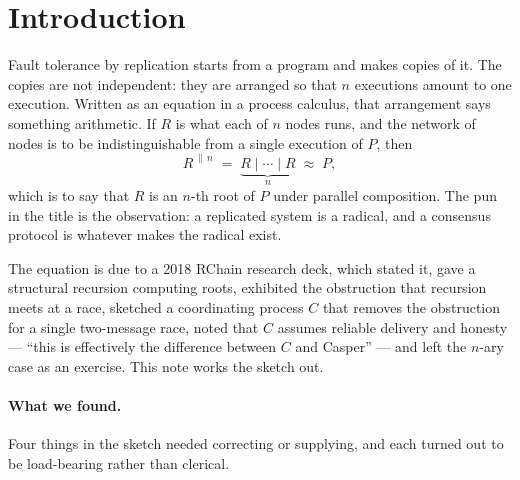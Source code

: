 \documentclass[11pt]{article}
\theoremstyle{definition}
\newcommand{\parn}[1]{{#1}^{\,\|\,n}}
\begin{document}
\section{Introduction}

Fault tolerance by replication starts from a program and makes copies of it. The copies are not independent: they are arranged so that $n$ executions amount to one execution. Written as an equation in a process calculus, that arrangement says something arithmetic. If $R$ is what each of $n$ nodes runs, and the network of nodes is to be indistinguishable from a single execution of $P$, then
\[
  \parn{R} \;=\; \underbrace{R \mid \cdots \mid R}_{n} \;\approx\; P ,
\]
which is to say that $R$ is an $n$-th root of $P$ under parallel composition. The pun in the title is the observation: a replicated system is a radical, and a consensus protocol is whatever makes the radical exist.

The equation is due to a 2018 RChain research deck, which stated it, gave a structural recursion computing roots, exhibited the obstruction that recursion meets at a race, sketched a coordinating process $C$ that removes the obstruction for a single two-message race, noted that $C$ assumes reliable delivery and honesty --- ``this is effectively the difference between $C$ and Casper'' --- and left the $n$-ary case as an exercise. This note works the sketch out.

\paragraph{What we found.} Four things in the sketch needed correcting or supplying, and each turned out to be load-bearing rather than clerical.
\end{document}
